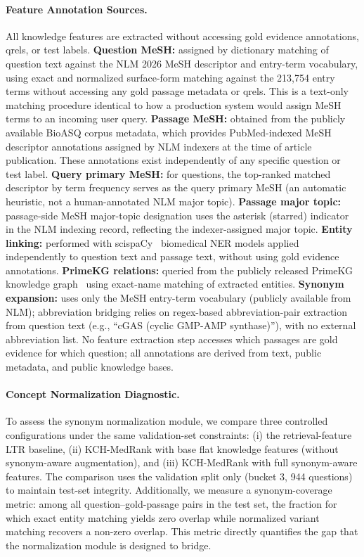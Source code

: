 \paragraph{Feature Annotation Sources.}
All knowledge features are extracted without accessing gold evidence annotations, qrels, or test labels. \textbf{Question MeSH:} assigned by dictionary matching of question text against the NLM 2026 MeSH descriptor and entry-term vocabulary, using exact and normalized surface-form matching against the 213,754 entry terms without accessing any gold passage metadata or qrels. This is a text-only matching procedure identical to how a production system would assign MeSH terms to an incoming user query. \textbf{Passage MeSH:} obtained from the publicly available BioASQ corpus metadata, which provides PubMed-indexed MeSH descriptor annotations assigned by NLM indexers at the time of article publication. These annotations exist independently of any specific question or test label. \textbf{Query primary MeSH:} for questions, the top-ranked matched descriptor by term frequency serves as the query primary MeSH (an automatic heuristic, not a human-annotated NLM major topic). \textbf{Passage major topic:} passage-side MeSH major-topic designation uses the asterisk (starred) indicator in the NLM indexing record, reflecting the indexer-assigned major topic. \textbf{Entity linking:} performed with scispaCy~\citep{neumann2019scispacy} biomedical NER models applied independently to question text and passage text, without using gold evidence annotations. \textbf{PrimeKG relations:} queried from the publicly released PrimeKG knowledge graph~\citep{chandak2023primekg} using exact-name matching of extracted entities. \textbf{Synonym expansion:} uses only the MeSH entry-term vocabulary (publicly available from NLM); abbreviation bridging relies on regex-based abbreviation-pair extraction from question text (e.g., ``cGAS (cyclic GMP-AMP synthase)''), with no external abbreviation list. No feature extraction step accesses which passages are gold evidence for which question; all annotations are derived from text, public metadata, and public knowledge bases.

\paragraph{Concept Normalization Diagnostic.}
To assess the synonym normalization module, we compare three controlled configurations under the same validation-set constraints: (i) the retrieval-feature LTR baseline, (ii) KCH-MedRank with base flat knowledge features (without synonym-aware augmentation), and (iii) KCH-MedRank with full synonym-aware features. The comparison uses the validation split only (bucket 3, 944 questions) to maintain test-set integrity. Additionally, we measure a synonym-coverage metric: among all question--gold-passage pairs in the test set, the fraction for which exact entity matching yields zero overlap while normalized variant matching recovers a non-zero overlap. This metric directly quantifies the gap that the normalization module is designed to bridge.

